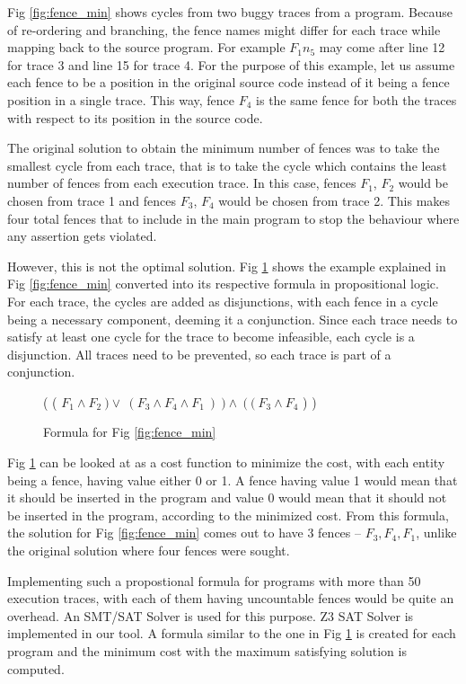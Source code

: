 Fig \ref{fig:fence_min} shows cycles from two buggy traces from a program. Because of re-ordering and branching, the fence names might differ for each trace while mapping back to the source program. For example \textit{$F_1n_5$} may come after line 12 for trace 3 and line 15 for trace 4. For the purpose of this example, let us assume each fence to be a position in the original source code instead of it being a fence position in a single trace. This way, fence \textit{$F_4$} is the same fence for both the traces with respect to its position in the source code.

\par
The original solution to obtain the minimum number of fences was to take the smallest cycle from each trace, that is to take the cycle which contains the least number of fences from each execution trace. In this case, fences \textit{$F_1$}, \textit{$F_2$} would be chosen from trace 1 and fences \textit{$F_3$}, \textit{$F_4$} would be chosen from trace 2. This makes four total fences that to include in the main program to stop the behaviour where any assertion gets violated.

\par
However, this is not the optimal solution. Fig \ref{fig:fence_form} shows the example explained in Fig \ref{fig:fence_min} converted into its respective formula in propositional logic. For each trace, the cycles are added as disjunctions, with each fence in a cycle being a necessary component, deeming it a conjunction. Since each trace needs to satisfy at least one cycle for the trace to become infeasible, each cycle is a disjunction. All traces need to be prevented, so each trace is part of a conjunction.

\begin{figure}
\begin{center}
	( ( $F_1 \land F_2\ ) \lor\ ( F_3 \land F_4 \land F_1\ )\ ) \land\ (\ (\ F_3 \land F_4$ ) )
	\caption{Formula for Fig \ref{fig:fence_min}}
	\label{fig:fence_form}
\end{center}
\end{figure}

\par
Fig \ref{fig:fence_form} can be looked at as a cost function to minimize the cost, with each entity being a fence, having value either 0 or 1. A fence having value 1 would mean that it should be inserted in the program and value 0 would mean that it should not be inserted in the program, according to the minimized cost. From this formula, the solution for Fig \ref{fig:fence_min} comes out to have 3 fences – \textit{$F_3, F_4, F_1$}, unlike the original solution where four fences were sought.

\par
Implementing such a propostional formula for programs with more than 50 execution traces, with each of them having uncountable fences would be quite an overhead. An SMT/SAT Solver is used for this purpose. Z3 SAT Solver is implemented in our tool. A formula similar to the one in Fig \ref{fig:fence_form} is created for each program and the minimum cost with the maximum satisfying solution is computed. 



